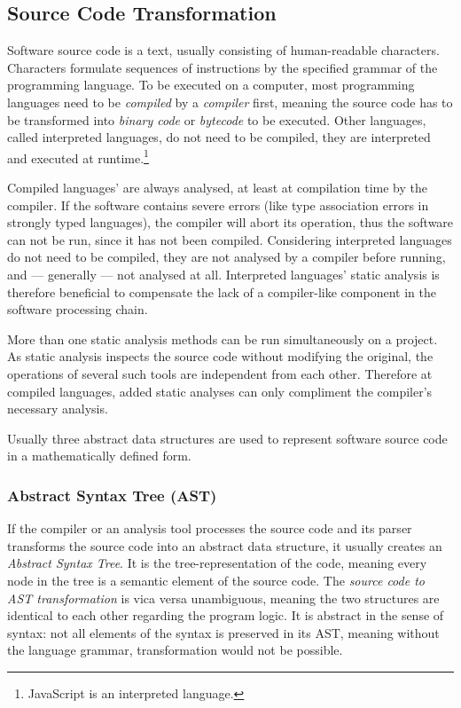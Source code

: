 \subsection{Source Code Transformation}

Software source code is a text, usually consisting of human-readable characters. Characters formulate sequences of instructions by the specified grammar of the programming language. To be executed on a computer, most programming languages need to be \emph{compiled} by a \emph{compiler} first, meaning the source code has to be transformed into \emph{binary code} or \emph{bytecode} to be executed. Other languages, called interpreted languages, do not need to be compiled, they are interpreted and executed at runtime.\footnote{JavaScript is an interpreted language.}

Compiled languages' are always analysed, at least at compilation time by the compiler. If the software contains severe errors (like type association errors in strongly typed languages), the compiler will abort its operation, thus the software can not be run, since it has not been compiled. Considering interpreted languages do not need to be compiled, they are not analysed by a compiler before running, and — generally — not analysed at all. Interpreted languages' static analysis is therefore beneficial to compensate the lack of a compiler-like component in the software processing chain.

More than one static analysis methods can be run simultaneously on a project. As static analysis inspects the source code without modifying the original, the operations of several such tools are independent from each other. Therefore at compiled languages, added static analyses can only compliment the compiler's necessary analysis.

Usually three abstract data structures are used to represent software source code in a mathematically defined form.


\subsubsection{Abstract Syntax Tree (AST)}

If the compiler or an analysis tool processes the source code and its parser transforms the source code into an abstract data structure, it usually creates an \emph{Abstract Syntax Tree}. It is the tree-representation of the code, meaning every node in the tree is a semantic element of the source code. The \emph{source code to AST transformation} is vica versa unambiguous, meaning the two structures are identical to each other regarding the program logic. It is abstract in the sense of syntax: not all elements of the syntax is preserved in its AST, meaning without the language grammar, transformation would not be possible.


